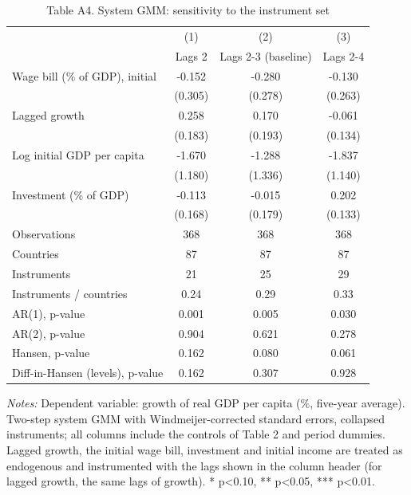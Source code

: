 \begin{table}[htbp]\centering\footnotesize
\providecommand{\sym}[1]{\ensuremath{^{#1}}}
\caption{Table A4. System GMM: sensitivity to the instrument set}\label{tab:TableA4_gmm_instruments}
\begin{tabular}{l*{3}{c}}
\toprule
 & (1) & (2) & (3) \\
 & Lags 2 & Lags 2-3 (baseline) & Lags 2-4 \\
\midrule
Wage bill (\% of GDP), initial & -0.152 & -0.280 & -0.130 \\
 & (0.305) & (0.278) & (0.263) \\
Lagged growth & 0.258 & 0.170 & -0.061 \\
 & (0.183) & (0.193) & (0.134) \\
Log initial GDP per capita & -1.670 & -1.288 & -1.837 \\
 & (1.180) & (1.336) & (1.140) \\
Investment (\% of GDP) & -0.113 & -0.015 & 0.202 \\
 & (0.168) & (0.179) & (0.133) \\
\midrule
Observations & 368 & 368 & 368 \\
Countries & 87 & 87 & 87 \\
Instruments & 21 & 25 & 29 \\
Instruments / countries & 0.24 & 0.29 & 0.33 \\
AR(1), p-value & 0.001 & 0.005 & 0.030 \\
AR(2), p-value & 0.904 & 0.621 & 0.278 \\
Hansen, p-value & 0.162 & 0.080 & 0.061 \\
Diff-in-Hansen (levels), p-value & 0.162 & 0.307 & 0.928 \\
\bottomrule
\end{tabular}
\begin{minipage}{0.95\linewidth}\vspace{4pt}\scriptsize \textit{Notes:} Dependent variable: growth of real GDP per capita (\%, five-year average). Two-step system GMM with Windmeijer-corrected standard errors, collapsed instruments; all columns include the controls of Table 2 and period dummies. Lagged growth, the initial wage bill, investment and initial income are treated as endogenous and instrumented with the lags shown in the column header (for lagged growth, the same lags of growth). * p<0.10, ** p<0.05, *** p<0.01.\end{minipage}
\end{table}
